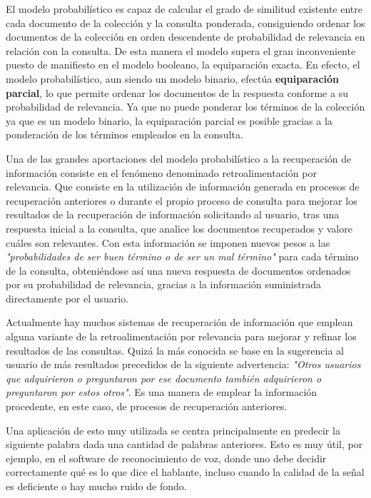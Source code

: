 \documentclass[titlepage]{article}
\begin{document}
El modelo probabilístico es capaz de calcular el grado de similitud existente entre cada documento de la colección y la consulta ponderada, consiguiendo ordenar los documentos de la colección en orden descendente de probabilidad de relevancia en relación con la consulta. De esta manera el modelo supera el gran inconveniente puesto de manifiesto en el modelo booleano, la equiparación exacta. En efecto, el modelo probabilístico, aun siendo un modelo binario, efectúa \textbf{equiparación parcial}, lo que permite ordenar los documentos de la respuesta conforme a su probabilidad de relevancia. Ya que no puede ponderar los términos de la colección ya que es un modelo binario, la equiparación parcial es posible gracias a la ponderación de los términos empleados en la consulta.

Una de las grandes aportaciones del modelo probabilístico a la recuperación de información consiste en el fenómeno denominado retroalimentación por relevancia. Que consiste en la utilización de información generada en procesos de recuperación anteriores o durante el propio proceso de consulta para mejorar los resultados de la recuperación de información solicitando al usuario, tras una respuesta inicial a la consulta, que analice los documentos recuperados y valore cuáles son relevantes. Con esta información se imponen nuevos pesos a las \textit{"probabilidades de ser buen término o de ser un mal término"} para cada término de la consulta, obteniéndose así una nueva respuesta de documentos ordenados por su probabilidad de relevancia, gracias a la información suministrada directamente por el usuario.

Actualmente hay muchos sistemas de recuperación de información que emplean alguna variante de la retroalimentación por relevancia para mejorar y refinar los resultados de las consultas. Quizá la más conocida se base en la sugerencia al usuario de más resultados precedidos de la siguiente advertencia: \textit{"Otros usuarios que adquirieron o preguntaron por ese documento también adquirieron o preguntaron por estos otros"}. Es una manera de emplear la información procedente, en este caso, de procesos de recuperación anteriores.

Una aplicación de esto muy utilizada se centra principalmente en predecir la siguiente palabra dada una cantidad de palabras anteriores. Esto es muy útil, por ejemplo, en el software de reconocimiento de voz, donde uno debe decidir correctamente qué es lo que dice el hablante, incluso cuando la calidad de la señal es deficiente o hay mucho ruido de fondo.
\end{document}

